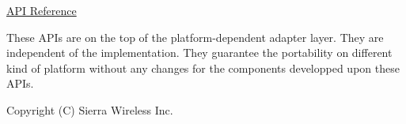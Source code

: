 \hyperlink{pa__temp_8h}{A\+PI Reference}





These A\+P\+Is are on the top of the platform-\/dependent adapter layer. They are independent of the implementation. They guarantee the portability on different kind of platform without any changes for the components developped upon these A\+P\+Is.





Copyright (C) Sierra Wireless Inc. 
